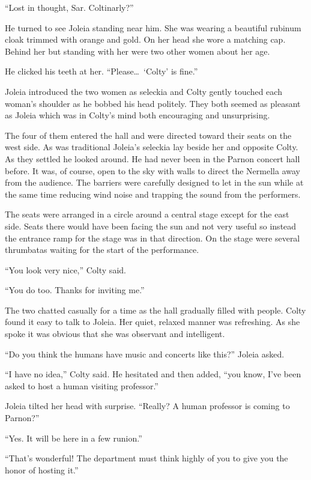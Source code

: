 ``Lost in thought, Sar. Coltinarly?''

He turned to see Joleia standing near him. She was wearing a beautiful rubinum cloak trimmed
with orange and gold. On her head she wore a matching cap. Behind her but standing with her were
two other women about her age.

He clicked his teeth at her. ``Please\ldots\ `Colty' is fine.''

Joleia introduced the two women as seleckia and Colty gently touched each woman's shoulder as he
bobbed his head politely. They both seemed as pleasant as Joleia which was in Colty's mind both
encouraging and unsurprising.

The four of them entered the hall and were directed toward their seats on the west side. As was
traditional Joleia's seleckia lay beside her and opposite Colty. As they settled he looked
around. He had never been in the Parnon concert hall before. It was, of course, open to the sky
with walls to direct the Nermella away from the audience. The barriers were carefully designed
to let in the sun while at the same time reducing wind noise and trapping the sound from the
performers.

The seats were arranged in a circle around a central stage except for the east side. Seats there
would have been facing the sun and not very useful so instead the entrance ramp for the stage
was in that direction. On the stage were several thrumbatas waiting for the start of the
performance.

``You look very nice,'' Colty said.

``You do too. Thanks for inviting me.''

The two chatted casually for a time as the hall gradually filled with people. Colty found it
easy to talk to Joleia. Her quiet, relaxed manner was refreshing. As she spoke it was obvious
that she was observant and intelligent.


``Do you think the humans have music and concerts like this?'' Joleia asked.

``I have no idea,'' Colty said. He hesitated and then added, ``you know, I've been asked to host
a human visiting professor.''

Joleia tilted her head with surprise. ``Really? A human professor is coming to Parnon?''

``Yes. It will be here in a few runion.''

``That's wonderful! The department must think highly of you to give you the honor of hosting
it.''


